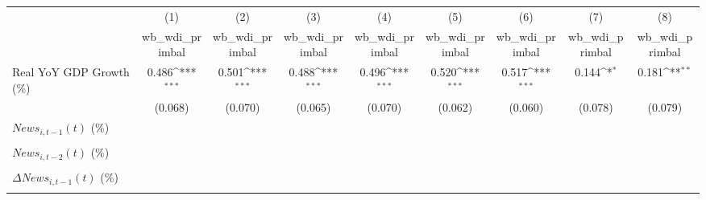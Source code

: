 {
\def\sym#1{\ifmmode^{#1}\else\(^{#1}\)\fi}
\begin{tabular}{l*{8}{c}}
\toprule
                    &\multicolumn{1}{c}{(1)}&\multicolumn{1}{c}{(2)}&\multicolumn{1}{c}{(3)}&\multicolumn{1}{c}{(4)}&\multicolumn{1}{c}{(5)}&\multicolumn{1}{c}{(6)}&\multicolumn{1}{c}{(7)}&\multicolumn{1}{c}{(8)}\\
                    &\multicolumn{1}{c}{wb_wdi_primbal}&\multicolumn{1}{c}{wb_wdi_primbal}&\multicolumn{1}{c}{wb_wdi_primbal}&\multicolumn{1}{c}{wb_wdi_primbal}&\multicolumn{1}{c}{wb_wdi_primbal}&\multicolumn{1}{c}{wb_wdi_primbal}&\multicolumn{1}{c}{wb_wdi_primbal}&\multicolumn{1}{c}{wb_wdi_primbal}\\
\midrule
Real YoY GDP Growth (\%)&       0.486\sym{***}&       0.501\sym{***}&       0.488\sym{***}&       0.496\sym{***}&       0.520\sym{***}&       0.517\sym{***}&       0.144\sym{*}  &       0.181\sym{**} \\
                    &     (0.068)         &     (0.070)         &     (0.065)         &     (0.070)         &     (0.062)         &     (0.060)         &     (0.078)         &     (0.079)         \\
\addlinespace
$ News_{i,t-1}(t)$ (\%)&                     &                     &                     &                     &                     &                     &                     &                     \\
                    &                     &                     &                     &                     &                     &                     &                     &                     \\
\addlinespace
$ News_{i,t-2}(t)$ (\%)&                     &                     &                     &                     &                     &                     &                     &                     \\
                    &                     &                     &                     &                     &                     &                     &                     &                     \\
\addlinespace
$ \Delta News_{i,t-1}(t)$ (\%)&                     &                     &                     &                     &                     &                     &                     &                     \\
                    &                     &                     &                     &                     &                     &                     &                     &                     \\

\end{tabular}}
